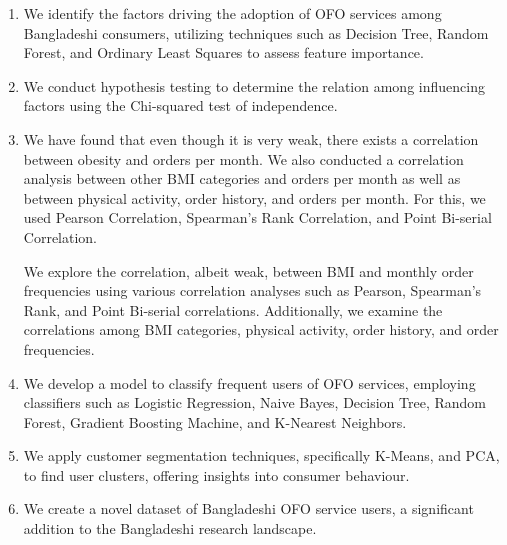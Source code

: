 \documentclass[a4paper,fleqn]{cas-sc}
\begin{document}
\begin{enumerate}

    \item We identify the factors driving the adoption of OFO services among Bangladeshi consumers, utilizing techniques such as Decision Tree, Random Forest, and Ordinary Least Squares to assess feature importance.
    
    \item We conduct hypothesis testing to determine the relation among influencing factors using the Chi-squared test of independence.
    
    \item We have found that even though it is very weak, there exists a correlation between obesity and orders per month. We also conducted a correlation analysis between other BMI categories and orders per month as well as between physical activity, order history, and orders per month. For this, we used Pearson Correlation, Spearman's Rank Correlation, and Point Bi-serial Correlation.  
    
    We explore the correlation, albeit weak, between BMI and monthly order frequencies using various correlation analyses such as Pearson, Spearman's Rank, and Point Bi-serial correlations. Additionally, we examine the correlations among BMI categories, physical activity, order history, and order frequencies.

    \item We develop a model to classify frequent users of OFO services, employing classifiers such as Logistic Regression, Naive Bayes, Decision Tree, Random Forest, Gradient Boosting Machine, and K-Nearest Neighbors.

    \item We apply customer segmentation techniques, specifically K-Means, and PCA, to find user clusters, offering insights into consumer behaviour.

    \item We create a novel dataset of Bangladeshi OFO service users, a significant addition to the Bangladeshi research landscape.

\end{enumerate}



\end{document}
